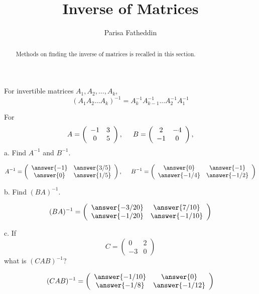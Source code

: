 \documentclass{ximera}
\author{Parisa Fatheddin}
\title{Inverse of Matrices}
\begin{document}
\begin{abstract}
Methods on finding the inverse of matrices is recalled in this section. 
\end{abstract}
\maketitle
\begin{center}
\end{center}

\begin{exercise}
\begin{hint}
For invertible matrices $A_{1}, A_{2},...,A_{k}$,
\begin{equation*}
\left(A_{1}A_{2}...A_{k}\right)^{-1} = A_{k}^{-1} A_{k-1}^{-1}...A_{2}^{-1} A_{1}^{-1}
\end{equation*}
\end{hint}
For
\[ A= \left(\begin{array}{cc}
  -1 & 3   \\
  0 &  5
\end{array}\right), \hspace{.5cm} B= \left(\begin{array}{cc}
  2 & -4   \\
  -1 &  0
\end{array}\right),
\]
a. Find $A^{-1}$ and $B^{-1}$.

\begin{prompt}
\[ A^{-1}= \left(\begin{array}{cc}
  \answer{-1} & \answer{3/5}   \\
  \answer{0} & \answer{1/5}
\end{array}\right), \hspace{.5cm} B^{-1}= \left(\begin{array}{cc}
  \answer{0} & \answer{-1}   \\
  \answer{-1/4} & \answer{-1/2}
\end{array}\right)\]
\end{prompt}

b. Find $(BA)^{-1}$.

\begin{prompt}
\[(BA)^{-1} = \left(\begin{array}{cc}
  \answer{-3/20} & \answer{7/10}   \\
  \answer{-1/20} & \answer{-1/10}
\end{array}\right)
\]
\end{prompt}

c. If
\[C = \left(\begin{array}{cc}
  0&2\\
  -3&0
\end{array}\right)
\]
what is $(CAB)^{-1}$?

\begin{prompt}
\[(CAB)^{-1}= \left(\begin{array}{cc}
  \answer{-1/10} & \answer{0}   \\
  \answer{-1/8} & \answer{-1/12}
\end{array}\right)
\]
\end{prompt}
\end{exercise}
\end{document}
